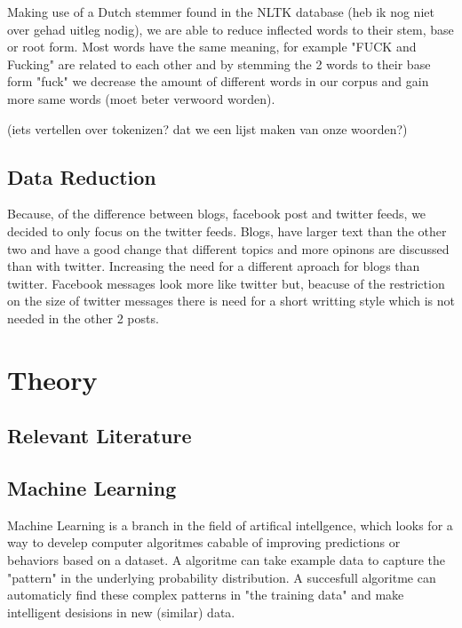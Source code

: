 \documentclass[11pt]{article}
\begin{document}
Making use of a Dutch stemmer found in the NLTK database (heb ik nog niet over gehad uitleg nodig), we are able to reduce inflected words to their stem, base or root form. Most words have the same meaning, for example "FUCK and Fucking"  are related to each other and by stemming the 2 words to their base form "fuck"  we decrease the amount of different words in our corpus and gain more same words (moet beter verwoord worden).

(iets vertellen over tokenizen? dat we een lijst maken van onze woorden?)

\subsection{Data Reduction}
Because, of the difference between blogs, facebook post and twitter feeds, we decided to only focus on the twitter feeds. 
Blogs, have larger text than the other two and have a good change that different topics and more opinons are discussed than with twitter. Increasing the need for a different aproach for blogs than twitter. 
Facebook messages look more like twitter but, beacuse of the restriction on the size of twitter messages there is need for a short writting style which is not needed in the other 2 posts. 





\section{Theory}
\subsection{Relevant Literature}

\subsection{Machine Learning} 
Machine Learning is a branch in the field of artifical intellgence, which looks for a way to develep computer algoritmes cabable of improving predictions or behaviors based on a dataset. A algoritme can take example data to capture the "pattern" in the underlying probability distribution. A succesfull algoritme can automaticly find these complex patterns in "the training data" and make intelligent desisions in new (similar) data.
\end{document}
